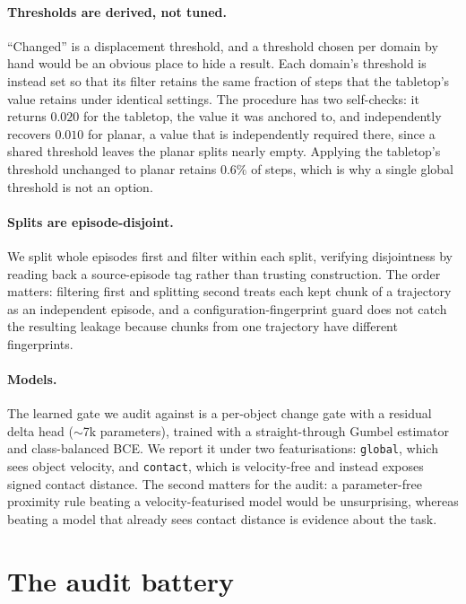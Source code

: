 \documentclass{article}
\begin{document}
\paragraph{Thresholds are derived, not tuned.} ``Changed'' is a displacement threshold, and a
threshold chosen per domain by hand would be an obvious place to hide a result. Each domain's
threshold is instead set so that its filter retains the same fraction of steps that the
tabletop's value retains under identical settings. The procedure has two self-checks: it
returns $0.020$ for the tabletop, the value it was anchored to, and independently recovers
$0.010$ for planar, a value that is independently required there, since a shared threshold
leaves the planar splits nearly empty. Applying the tabletop's threshold unchanged to planar
retains $0.6\%$ of steps, which is why a single global threshold is not an option.

\paragraph{Splits are episode-disjoint.} We split whole episodes first and filter within each
split, verifying disjointness by reading back a source-episode tag rather than trusting
construction. The order matters: filtering first and splitting second treats each kept chunk of
a trajectory as an independent episode, and a configuration-fingerprint guard does not catch the
resulting leakage because chunks from one trajectory have different fingerprints.

\paragraph{Models.} The learned gate we audit against is a per-object change gate with a
residual delta head ($\sim$7k parameters), trained with a straight-through Gumbel estimator
\citep{jang2017gumbel,maddison2017concrete} and class-balanced BCE. We report it under two
featurisations: \texttt{global}, which sees object velocity, and \texttt{contact}, which is
velocity-free and instead exposes signed contact distance. The second matters for the audit:
a parameter-free proximity rule beating a velocity-featurised model would be unsurprising,
whereas beating a model that already sees contact distance is evidence about the task.

\section{The audit battery}
\label{sec:battery}
\end{document}
